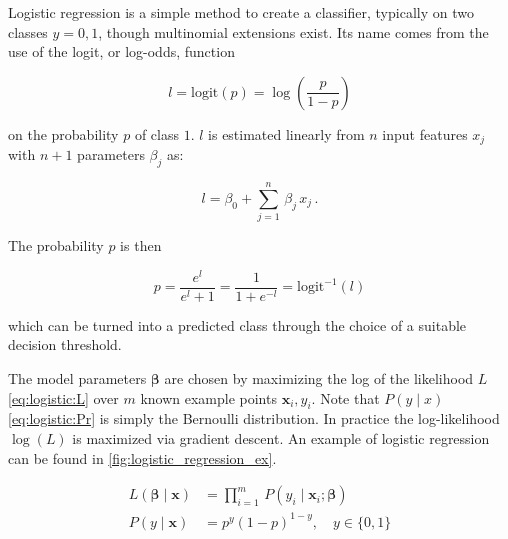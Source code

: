 Logistic regression is a simple method to create a classifier,
typically on two classes $y = 0,1$, though multinomial extensions exist.
Its name comes from the use of the logit, or log-odds, function

\begin{equation}\label{eq:logistic:logic}
l = \text{logit}\left(p\right) = \log\left(\frac{p}{1-p}\right)
\end{equation}

\noindent on the probability $p$ of class $1$.
$l$ is estimated linearly from $n$ input features $x_{j}$ with $n+1$ parameters $\beta_{j}$ as:

\begin{equation}\label{eq:logistic:logicBeta}
l = \beta_{0} + \sum_{j=1}^{n} \, \beta_{j}\,x_{j}\,.
\end{equation}

\noindent The probability $p$ is then

\begin{equation}\label{eq:logistic:p}
p = \frac{e^l}{e^l + 1} = \frac{1}{1+e^{-l}} = \text{logit}^{-1}\left(l\right)
\end{equation}

\noindent which can be turned into a predicted class through the choice of a suitable decision threshold.

The model parameters $\bm{\beta}$ are chosen by maximizing
the log of the likelihood $L$ \cref{eq:logistic:L} over $m$ known example points $\mathbf{x}_{i}, y_{i}$.
Note that $P\left(y \mid x\right)$ \cref{eq:logistic:Pr} is simply the Bernoulli distribution.
In practice the log-likelihood $\log\left(L\right)$ is maximized via gradient descent.
An example of logistic regression can be found in \cref{fig:logistic_regression_ex}.

\begin{subequations} \label{eq:logistic:L_Pr}
\begin{align}
L\left(\bm{\beta} \mid \mathbf{x}\right) &= \prod_{i=1}^{m} \, P\left(y_{i} \mid \mathbf{x}_{i}; \bm{\beta}\right) \label{eq:logistic:L} \\
P\left(y \mid \mathbf{x}\right) &= p^y\left(1-p\right)^{1-y}, \quad y \in \{0, 1\} \label{eq:logistic:Pr}
\end{align}
\end{subequations}

